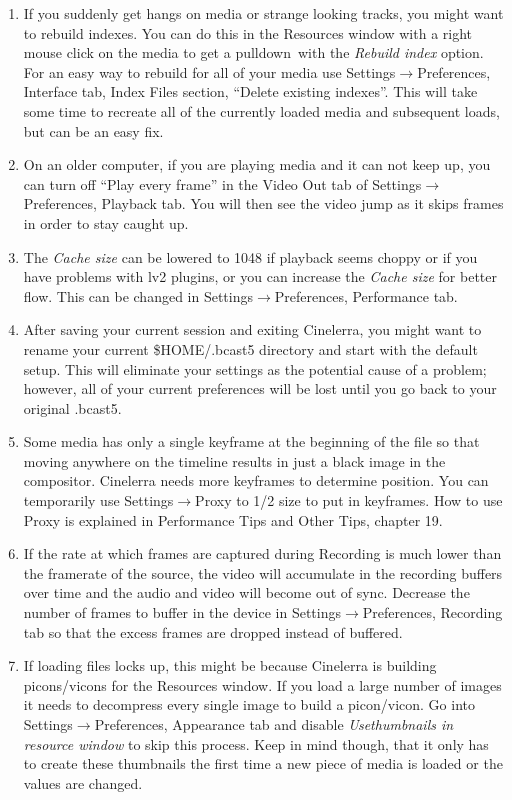 \begin{enumerate}[nosep]
	\item If you suddenly get hangs on media or strange looking tracks, you might want to rebuild indexes. You can do this in the Resources window with a right mouse click on the media to get a pulldown\ with the \textit{Rebuild index} option. For an easy way to rebuild for all of your media use Settings$\rightarrow$Preferences, Interface tab, Index Files section, ``Delete existing indexes''. This will take some time to recreate all of the currently loaded media and subsequent loads, but can be an easy fix.
	\item On an older computer, if you are playing media and it can not keep up, you can turn off ``Play every frame'' in the Video Out tab of Settings$\rightarrow$Preferences, Playback tab. You will then see the video jump as it skips frames in order to stay caught up.
	\item The \textit{Cache size} can be lowered to 1048 if playback seems choppy or if you have problems with lv2 plugins, or you can increase the \textit{Cache size} for better flow. This can be changed in Settings$\rightarrow$Preferences, Performance tab.
	\item After saving your current session and exiting Cinelerra, you might want to rename your current \$HOME/.bcast5 directory and start with the default setup. This will eliminate your settings as the potential cause of a problem; however, all of your current preferences will be lost until you go back to your original .bcast5.
	\item Some media has only a single keyframe at the beginning of the file so that moving anywhere on the timeline results in just a black image in the compositor. Cinelerra needs more keyframes to determine position. You can temporarily use Settings$\rightarrow$Proxy to 1/2 size to put in keyframes. How to use Proxy is explained in Performance Tips and Other Tips, chapter 19.
	\item If the rate at which frames are captured during Recording is much lower than the framerate of the source, the video will accumulate in the recording buffers over time and the audio and video will become out of sync. Decrease the number of frames to buffer in the device in Settings$\rightarrow $Preferences, Recording tab so that the excess frames are dropped instead of buffered.
	\item If loading files locks up, this might be because Cinelerra is building picons/vicons for the Resources window. If you load a large number of images it needs to decompress every single image to build a picon/vicon. Go into Settings$\rightarrow$Preferences, Appearance tab and disable \textit{Use}\textit{thumbnails in resource window} to skip this process. Keep in mind though, that it only has to create these thumbnails the first time a new piece of media is loaded or the values are changed.

\end{enumerate}
